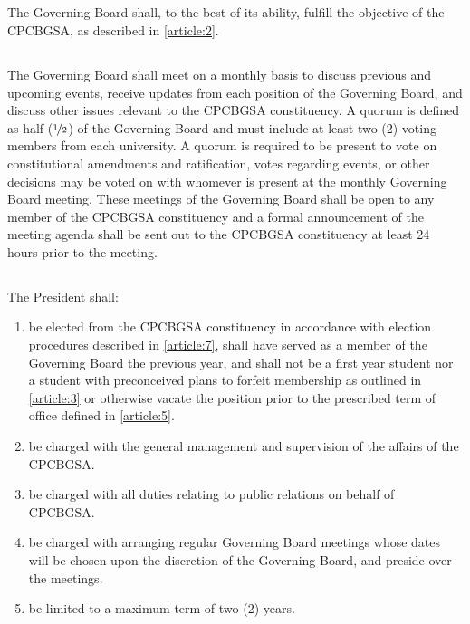 \documentclass[11pt,a4paper]{article}
\begin{document}
\subsection{}The Governing Board shall, to the best of its ability, fulfill the objective of the CPCBGSA, as described in \cref{article:2}.

\subsection{}The Governing Board shall meet on a monthly basis to discuss previous and upcoming events, receive updates from each position of the Governing Board, and discuss other issues relevant to the CPCBGSA constituency. A quorum is defined as half ($\nicefrac{1}{2}$) of the Governing Board and must include at least two (2) voting members from each university. A quorum is required to be present to vote on constitutional amendments and ratification, votes regarding events, or other decisions may be voted on with whomever is present at the monthly Governing Board meeting. These meetings of the Governing Board shall be open to any member of the CPCBGSA constituency and a formal announcement of the meeting agenda shall be sent out to the CPCBGSA constituency at least 24 hours prior to the meeting.  

\subsection{} The President shall:
\begin{enumerate}
    \item be elected from the CPCBGSA constituency in accordance with election procedures described in \cref{article:7}, shall have served as a member of the Governing Board the previous year, and shall not be a first year student nor a student with preconceived plans to forfeit membership as outlined in \cref{article:3} or otherwise vacate the position prior to the prescribed term of office defined in \cref{article:5}.
    \item be charged with the general management and supervision of the affairs of the CPCBGSA.
    \item be charged with all duties relating to public relations on behalf of CPCBGSA.
    \item be charged with arranging regular Governing Board meetings whose dates will be chosen upon the discretion of the Governing Board, and preside over the meetings.
    \item be limited to a maximum term of two (2) years.
\end{enumerate}
\end{document}
